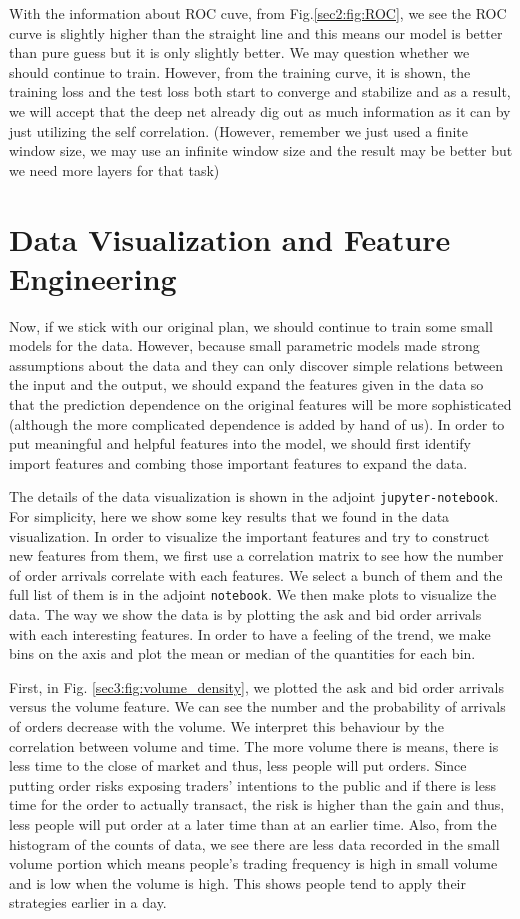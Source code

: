 \documentclass[letterpaper,12pt]{article}
\numberwithin{equation}{section}
\begin{document}
With the information about ROC cuve, from Fig.\ref{sec2:fig:ROC}, we see the ROC curve is slightly higher than the straight line and this means our model is better than pure guess but it is only slightly better. We may question whether we should continue to train. However, from the training curve, it is shown, the training loss and the test loss both start to converge and stabilize and as a result, we will accept that the deep net already dig out as much information as it can by just utilizing the self correlation. (However, remember we just used a finite window size, we may use an infinite window size and the result may be better but we need more layers for that task)


\section{Data Visualization and Feature Engineering}

Now, if we stick with our original plan, we should continue to train some small models for the data. However, because small parametric models made strong assumptions about the data and they can only discover simple relations between the input and the output, we should expand the features given in the data so that the prediction dependence on the original features will be more sophisticated (although the more complicated dependence is added by hand of us).  In order to put meaningful and helpful features into the model, we should first identify import features and combing those important features to expand the data.

The details of the data visualization is shown in the adjoint \texttt{jupyter-notebook}. For simplicity, here we show some key results that we found in the data visualization. In order to visualize the important features and try to construct new features from them, we first use a correlation matrix to see how the number of order arrivals correlate with each features. We select a bunch of them and the full list of them is in the adjoint \texttt{notebook}. We then make plots to visualize the data. The way we show the data is by plotting the ask and bid order arrivals with each interesting features. In order to have a feeling of the trend, we make bins on the axis and plot the mean or median of the quantities for each bin. 

First, in Fig. \ref{sec3:fig:volume_density}, we plotted the ask and bid order arrivals versus the volume feature. We can see the number and the probability of arrivals of orders decrease with the volume. We interpret this behaviour by the correlation between volume and time. The more volume there is means, there is less time to the close of market and thus, less people will put orders. Since putting order risks exposing traders' intentions to the public and if there is less time for the order to actually transact, the risk is higher than the gain and thus, less people will put order at a later time than at an earlier time. Also, from the histogram of the counts of data, we see there are less data recorded in the small volume portion which means people's trading frequency is high in small volume and is low when the volume is high. This shows people tend to apply their strategies earlier in a day.
\end{document}
